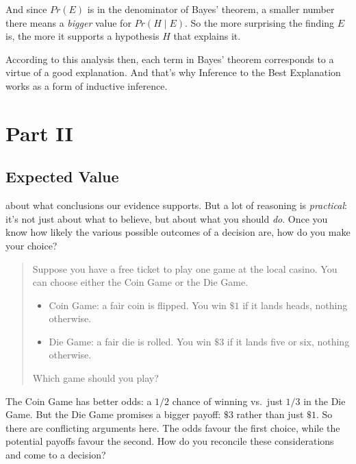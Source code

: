 \documentclass[justified]{tufte-book}
\providecommand{\tightlist}{%
  \setlength{\itemsep}{0pt}\setlength{\parskip}{0pt}}
\newcommand{\given}{\mid}
\newcommand{\p}{Pr}
\newenvironment{problem}{\begin{quote}\normalsize}{\end{quote}}
\theoremstyle{definition}
\theoremstyle{definition}
\theoremstyle{definition}
\theoremstyle{remark}
\begin{document}
And since \(\p(E)\) is in the denominator of Bayes' theorem, a smaller number there means a \emph{bigger} value for \(\p(H \given E)\). So the more surprising the finding \(E\) is, the more it supports a hypothesis \(H\) that explains it.

According to this analysis then, each term in Bayes' theorem corresponds to a virtue of a good explanation. And that's why Inference to the Best Explanation works as a form of inductive inference.

\hypertarget{part-part-ii}{%
\part*{Part II}\label{part-part-ii}}

\hypertarget{expected-value}{%
\chapter{Expected Value}\label{expected-value}}

 about what conclusions our evidence supports. But a lot of reasoning is \emph{practical}: it's not just about what to believe, but about what you should \emph{do}. Once you know how likely the various possible outcomes of a decision are, how do you make your choice?

\begin{problem}
Suppose you have a free ticket to play one game at the local casino. You
can choose either the Coin Game or the Die Game.

\begin{itemize}
\tightlist
\item
  Coin Game: a fair coin is flipped. You win \(\$1\) if it lands heads,
  nothing otherwise.
\item
  Die Game: a fair die is rolled. You win \(\$3\) if it lands five or
  six, nothing otherwise.
\end{itemize}

Which game should you play?
\end{problem}

The Coin Game has better odds: a \(1/2\) chance of winning vs.~just \(1/3\) in the Die Game. But the Die Game promises a bigger payoff: \(\$3\) rather than just \(\$1\). So there are conflicting arguments here. The odds favour the first choice, while the potential payoffs favour the second. How do you reconcile these considerations and come to a decision?
\end{document}
